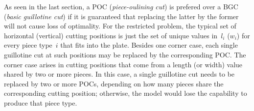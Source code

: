 \documentclass[ppgc,tese,english,formais,babel]{iiufrgs}
\begin{document}
As seen in the last section, a POC (\emph{piece-oulining cut}) is prefered over a BGC (\emph{basic guillotine cut}) if it is guaranteed that replacing the latter by the former will not cause loss of optimality.
For the restricted problem, the typical set of horizontal (vertical) cutting positions is just the set of unique values in~\(l_i\) (\(w_i\)) for every piece type~\(i\) that fits into the plate.
Besides one corner case, each single guillotine cut at such positions may be replaced by the corresponding POC.
The corner case arises in cutting positions that come from a length (or width) value shared by two or more pieces.
In this case, a single guillotine cut needs to be replaced by two or more POCs, depending on how many pieces share the corresponding cutting position; otherwise, the model would lose the capability to produce that piece type.
\end{document}
